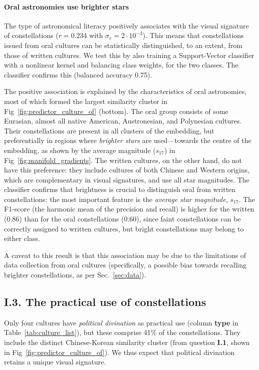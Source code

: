\documentclass[10pt]{article}
\begin{document}
\paragraph{Oral astronomies use brighter stars} The type of astronomical literacy positively associates with the visual signature of constellations ($r = 0.234$ with $\sigma_r = 2\cdot 10^{-3}$). This means that constellations issued from oral cultures can be statistically distinguished, to an extent, from those of written cultures. We test this by also training a Support-Vector classifier with a nonlinear kernel and balancing class weights, for the two classes. The classifier confirms this (balanced accuracy 0.75).

The positive association is explained by the characteristics of oral astronomies, most of which formed the largest similarity cluster in Fig~\ref{fig:predictor_culture_of} (bottom). The oral group consists of some Eurasian, almost all native American, Austronesian, and Polynesian cultures. Their constellations are present in all clusters of the embedding, but preferentially in regions where \emph{brighter stars} are used---towards the centre of the embedding, as shown by the average magnitude ($s_{17}$) in Fig~\ref{fig:manifold_gradients}. The written cultures, on the other hand, do not have this preference: they include cultures of both Chinese and Western origins, which are complementary in visual signatures, and use all star magnitudes. The classifier confirms that brightness is crucial to distinguish oral from written constellations: the most important feature is the \emph{average star magnitude}, $s_{17}$. The F1-score (the harmonic mean of the precision and recall) is higher for the written (0.86) than for the oral constellations (0.60), since faint constellations can be correctly assigned to written cultures, but bright constellations may belong to either class.

A caveat to this result is that this association may be due to the limitations of data collection from oral cultures (specifically, a possible bias towards recalling brighter constellations, as per Sec.~\ref{sec:data}).

\subsection*{I.3. The practical {\bf use} of constellations} %
%
Only four cultures have \emph{political divination} as practical use (column {\bf type} in Table~\ref{tab:culture_list}), but these comprise 41\% of the constellations. They include the distinct Chinese-Korean similarity cluster (from question {\bf I.1}, shown in Fig~\ref{fig:predictor_culture_of}). We thus expect that political divination retains a unique visual signature.
\end{document}
